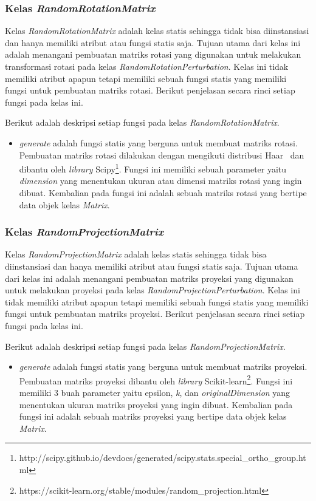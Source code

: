 \subsubsection{Kelas \textit{RandomRotationMatrix}}
\label{subsubsec:kelas-rrm}

Kelas \textit{RandomRotationMatrix} adalah kelas statis sehingga tidak bisa diinstansiasi dan hanya memiliki atribut atau fungsi statis saja. Tujuan utama dari kelas ini adalah menangani pembuatan matriks rotasi yang digunakan untuk melakukan transformasi rotasi pada kelas \textit{RandomRotationPerturbation}. Kelas ini tidak memiliki atribut apapun tetapi memiliki sebuah fungsi statis yang memiliki fungsi untuk pembuatan matriks rotasi. Berikut penjelasan secara rinci setiap fungsi pada kelas ini.

Berikut adalah deskripsi setiap fungsi pada kelas \textit{RandomRotationMatrix}.
\begin{itemize}
	\item \textit{generate} adalah fungsi statis yang berguna untuk membuat matriks rotasi. Pembuatan matriks rotasi dilakukan dengan mengikuti distribusi Haar~\cite{stewart:80:orthogonal} dan dibantu oleh \textit{library} Scipy\footnote{http://scipy.github.io/devdocs/generated/scipy.stats.special\_ortho\_group.html}. Fungsi ini memiliki sebuah parameter yaitu \textit{dimension} yang menentukan ukuran atau dimensi matriks rotasi yang ingin dibuat. Kembalian pada fungsi ini adalah sebuah matriks rotasi yang bertipe data objek kelas \textit{Matrix}.
\end{itemize}

\subsubsection{Kelas \textit{RandomProjectionMatrix}}
\label{subsubsec:kelas-rpm}

Kelas \textit{RandomProjectionMatrix} adalah kelas statis sehingga tidak bisa diinstansiasi dan hanya memiliki atribut atau fungsi statis saja. Tujuan utama dari kelas ini adalah menangani pembuatan matriks proyeksi yang digunakan untuk melakukan proyeksi pada kelas \textit{RandomProjectionPerturbation}. Kelas ini tidak memiliki atribut apapun tetapi memiliki sebuah fungsi statis yang memiliki fungsi untuk pembuatan matriks proyeksi. Berikut penjelasan secara rinci setiap fungsi pada kelas ini.

Berikut adalah deskripsi setiap fungsi pada kelas \textit{RandomProjectionMatrix}.
\begin{itemize}
	\item \textit{generate} adalah fungsi statis yang berguna untuk membuat matriks proyeksi. Pembuatan matriks proyeksi dibantu oleh \textit{library} Scikit-learn\footnote{https://scikit-learn.org/stable/modules/random\_projection.html}. Fungsi ini memiliki 3 buah parameter yaitu epsilon, \textit{k}, dan \textit{originalDimension} yang menentukan ukuran matriks proyeksi yang ingin dibuat. Kembalian pada fungsi ini adalah sebuah matriks proyeksi yang bertipe data objek kelas \textit{Matrix}.
\end{itemize}

